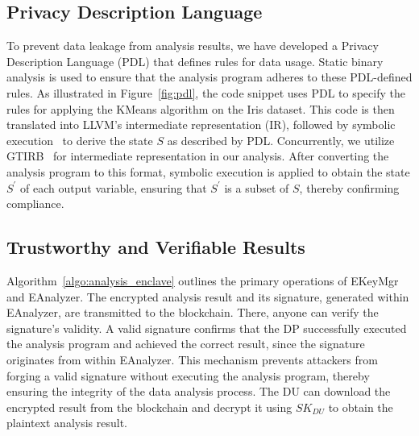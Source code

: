 \subsection{Privacy Description Language}
To prevent data leakage from analysis results, we have developed a Privacy Description Language (PDL) that defines rules for data usage. Static binary analysis is used to ensure that the analysis program adheres to these PDL-defined rules. As illustrated in Figure~\ref{fig:pdl}, the code snippet uses PDL to specify the rules for applying the KMeans algorithm on the Iris dataset. This code is then translated into LLVM's intermediate representation (IR), followed by symbolic execution~\cite{king1976symbolic,baldoni2018survey} to derive the state $S$ as described by PDL. Concurrently, we utilize GTIRB~\cite{schulte2019gtirb} for intermediate representation in our analysis. After converting the analysis program to this format, symbolic execution is applied to obtain the state $S^{\prime}$ of each output variable, ensuring that $S^{\prime}$ is a subset of $S$, thereby confirming compliance.

\subsection{Trustworthy and Verifiable Results}
Algorithm~\ref{algo:analysis_enclave} outlines the primary operations of EKeyMgr and EAnalyzer. The encrypted analysis result and its signature, generated within EAnalyzer, are transmitted to the blockchain. There, anyone can verify the signature's validity. A valid signature confirms that the DP successfully executed the analysis program and achieved the correct result, since the signature originates from within EAnalyzer. This mechanism prevents attackers from forging a valid signature without executing the analysis program, thereby ensuring the integrity of the data analysis process. The DU can download the encrypted result from the blockchain and decrypt it using $SK_{DU}$ to obtain the plaintext analysis result.


